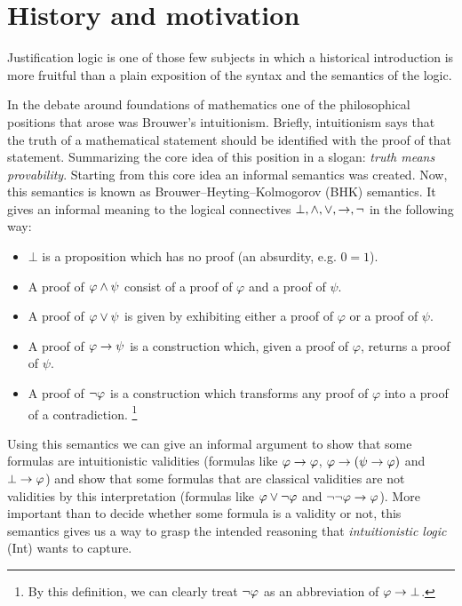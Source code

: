 \section{History and motivation}


\qquad Justification logic is one of those few subjects in which a historical introduction is more fruitful than a plain exposition of the syntax and the semantics of the logic.

\qquad In the debate around foundations of mathematics one of the philosophical positions that arose was Brouwer's intuitionism. Briefly, intuitionism says that the truth of a mathematical statement should be identified with the proof of that statement. Summarizing the core idea of this position in a slogan: \textit{truth means provability}. Starting from this core idea an informal semantics was created. Now, this semantics is known as Brouwer–Heyting–Kolmogorov (BHK) semantics. It gives an informal meaning to the logical connectives $\bot, \wedge, \vee, \rightarrow, \neg$ in the following way:

\begin{itemize}
	\item $\bot$ is a proposition which has no proof (an absurdity, e.g. $0=1$).
	\item A proof of $\varphi \wedge \psi$ consist of a proof of $\varphi$ and a proof of $\psi$.
	\item A proof of $\varphi \vee \psi$ is given by exhibiting either a proof of $\varphi$ or a proof of $\psi$.
	\item A proof of $\varphi \rightarrow \psi$ is a construction which, given a proof of $\varphi$, returns a proof of $\psi$.
	\item A proof of $\neg \varphi$ is a construction which transforms any proof of $\varphi$ into a proof of a contradiction. \footnote{By this definition, we can clearly treat $\neg \varphi$ as an abbreviation of $\varphi \rightarrow \bot$.} 
\end{itemize}

\qquad Using this semantics we can give an informal argument to show that some formulas are intuitionistic validities (formulas like $\varphi \rightarrow \varphi$, $\varphi \rightarrow (\psi \rightarrow \varphi)$ and $\bot \rightarrow \varphi$) and show that some formulas that are classical validities are not validities by this interpretation (formulas like $\varphi \vee \neg \varphi$ and $\neg\neg\varphi \rightarrow \varphi$). More important than to decide whether some formula is a validity or not, this semantics gives us a way to grasp the intended reasoning that \textit{intuitionistic logic} (Int) wants to capture.

